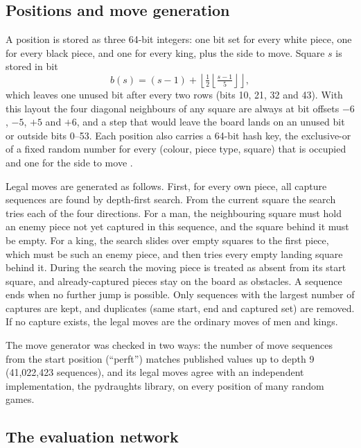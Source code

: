 \subsection{Positions and move generation}\label{sec:board}

A position is stored as three 64-bit integers: one bit set for every white piece,
one for every black piece, and one for every king, plus the side to move. Square
$s$ is stored in bit
\begin{equation}\label{eq:bit}
  b(s) = (s-1) + \left\lfloor \tfrac{1}{2}\left\lfloor \tfrac{s-1}{5}\right\rfloor \right\rfloor ,
\end{equation}
which leaves one unused bit after every two rows (bits 10, 21, 32 and 43). With
this layout the four diagonal neighbours of any square are always at bit offsets
$-6$, $-5$, $+5$ and $+6$, and a step that would leave the board lands on an
unused bit or outside bits 0--53. Each position also carries a 64-bit hash key,
the exclusive-or of a fixed random number for every (colour, piece type, square)
that is occupied and one for the side to move \parencite{zobrist1970}.

Legal moves are generated as follows. First, for every own piece, all capture
sequences are found by depth-first search. From the current square the search
tries each of the four directions. For a man, the neighbouring square must hold
an enemy piece not yet captured in this sequence, and the square behind it must
be empty. For a king, the search slides over empty squares to the first piece,
which must be such an enemy piece, and then tries every empty landing square
behind it. During the search the moving piece is treated as absent from its start
square, and already-captured pieces stay on the board as obstacles. A sequence
ends when no further jump is possible. Only sequences with the largest number of
captures are kept, and duplicates (same start, end and captured set) are removed.
If no capture exists, the legal moves are the ordinary moves of men and kings.

The move generator was checked in two ways: the number of move sequences from
the start position (``perft'') matches published values up to depth 9
(41{,}022{,}423 sequences), and its legal moves agree with an independent
implementation, the pydraughts library, on every position of many random games.

\subsection{The evaluation network}\label{sec:network}

